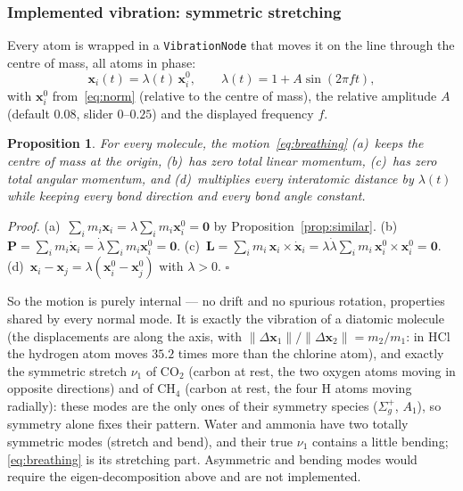 \documentclass[a4paper, 11pt]{article}
\newtheorem{proposition}{{\bf Proposition}}
\newcommand{\code}[1]{\texttt{#1}}
\begin{document}
\subsubsection{Implemented vibration: symmetric stretching}

Every atom is wrapped in a \code{VibrationNode} that moves it on the line through the centre of mass, all atoms in phase:
\begin{equation}
  \mathbf x_i(t)=\lambda(t)\,\mathbf x_i^0,\qquad \lambda(t)=1+A\sin(2\pi f t),
  \label{eq:breathing}
\end{equation}
with $\mathbf x_i^0$ from~\eqref{eq:norm} (relative to the centre of mass), the relative amplitude $A$ (default $0.08$, slider $0$--$0.25$) and the
displayed frequency $f$.

\begin{proposition}\label{prop:vib}
For every molecule, the motion~\eqref{eq:breathing} (a)~keeps the centre of mass at the origin, (b)~has zero total linear momentum,
(c)~has zero total angular momentum, and (d)~multiplies every interatomic distance by $\lambda(t)$ while keeping every bond direction and every
bond angle constant.
\end{proposition}
\noindent\textit{Proof.} (a)~$\sum_i m_i\mathbf x_i=\lambda\sum_i m_i\mathbf x_i^0=\mathbf 0$ by Proposition~\ref{prop:similar}.
(b)~$\mathbf P=\sum_i m_i\dot{\mathbf x}_i=\dot\lambda\sum_i m_i\mathbf x_i^0=\mathbf 0$.
(c)~$\mathbf L=\sum_i m_i\,\mathbf x_i\times\dot{\mathbf x}_i=\lambda\dot\lambda\sum_i m_i\,\mathbf x_i^0\times\mathbf x_i^0=\mathbf 0$.
(d)~$\mathbf x_i-\mathbf x_j=\lambda(\mathbf x_i^0-\mathbf x_j^0)$ with $\lambda>0$. \hfill$\square$

So the motion is purely internal --- no drift and no spurious rotation, properties shared by every normal mode. It is exactly the vibration of a
diatomic molecule (the displacements are along the axis, with $\|\Delta\mathbf x_1\|/\|\Delta\mathbf x_2\|=m_2/m_1$: in HCl the hydrogen atom moves
$35.2$ times more than the chlorine atom), and exactly the symmetric stretch $\nu_1$ of CO$_2$ (carbon at rest, the two oxygen atoms moving in
opposite directions) and of CH$_4$ (carbon at rest, the four H atoms moving radially): these modes are the only ones of their symmetry species
($\Sigma_g^+$, $A_1$), so symmetry alone fixes their pattern. Water and ammonia have two totally symmetric modes (stretch and bend), and their true
$\nu_1$ contains a little bending; \eqref{eq:breathing} is its stretching part. Asymmetric and bending modes would require the eigen-decomposition
above and are not implemented.
\end{document}
